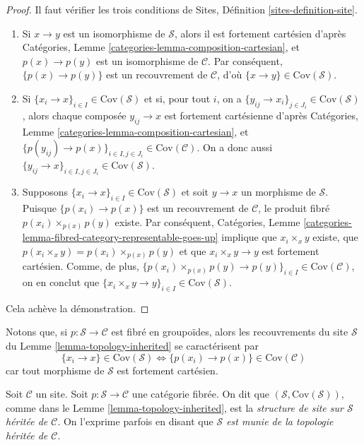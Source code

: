\begin{proof}
Il faut vérifier les trois conditions de
Sites, Définition \ref{sites-definition-site}.
\begin{enumerate}
\item Si $x \to y$ est un isomorphisme de $\mathcal{S}$, alors
il est fortement cartésien d'après
Catégories, Lemme \ref{categories-lemma-composition-cartesian},
et $p(x) \to p(y)$ est un isomorphisme de $\mathcal{C}$. Par conséquent,
$\{p(x) \to p(y)\}$ est un recouvrement de $\mathcal{C}$, d'où
$\{x \to y\} \in \text{Cov}(\mathcal{S})$.
\item Si $\{x_i \to x\}_{i\in I} \in \text{Cov}(\mathcal{S})$ et si, pour tout
$i$, on a $\{y_{ij} \to x_i\}_{j\in J_i} \in \text{Cov}(\mathcal{S})$, alors
chaque composée $y_{ij} \to x$ est fortement cartésienne d'après
Catégories, Lemme \ref{categories-lemma-composition-cartesian},
et $\{p(y_{ij}) \to p(x)\}_{i \in I, j\in J_i} \in \text{Cov}(\mathcal{C})$.
On a donc aussi $\{y_{ij} \to x\}_{i \in I, j\in J_i} \in \text{Cov}(\mathcal{S})$.
\item Supposons $\{x_i \to x\}_{i\in I}\in \text{Cov}(\mathcal{S})$
et soit $y \to x$ un morphisme de $\mathcal{S}$. Puisque $\{p(x_i) \to p(x)\}$
est un recouvrement de $\mathcal{C}$, le produit fibré
$p(x_i) \times_{p(x)} p(y)$ existe. Par conséquent,
Catégories, Lemme \ref{categories-lemma-fibred-category-representable-goes-up}
implique que $x_i \times_x y$ existe, que $p(x_i \times_x y) =
p(x_i) \times_{p(x)} p(y)$ et que $x_i \times_x y \to y$ est
fortement cartésien. Comme, de plus,
$\{p(x_i) \times_{p(x)} p(y) \to p(y) \}_{i\in I} \in \text{Cov}(\mathcal{C})$,
on en conclut que
$\{x_i \times_x y \to y \}_{i\in I} \in \text{Cov}(\mathcal{S})$.
\end{enumerate}
Cela achève la démonstration.
\end{proof}

\noindent
Notons que, si $p : \mathcal{S} \to \mathcal{C}$ est fibré en groupoïdes, alors
les recouvrements du site $\mathcal{S}$ du
Lemme \ref{lemma-topology-inherited}
se caractérisent par
$$
\{x_i \to x\} \in \text{Cov}(\mathcal{S})
\Leftrightarrow
\{p(x_i) \to p(x)\} \in \text{Cov}(\mathcal{C})
$$
car tout morphisme de $\mathcal{S}$ est fortement cartésien.

\begin{definition}
\label{definition-topology-inherited}
Soit $\mathcal{C}$ un site. Soit $p : \mathcal{S} \to \mathcal{C}$ une
catégorie fibrée. On dit que $(\mathcal{S}, \text{Cov}(\mathcal{S}))$, comme dans le
Lemme \ref{lemma-topology-inherited},
est la {\it structure de site sur $\mathcal{S}$ héritée de $\mathcal{C}$}.
On l'exprime parfois en disant que
{\it $\mathcal{S}$ est munie de la topologie héritée de $\mathcal{C}$}.
\end{definition}

